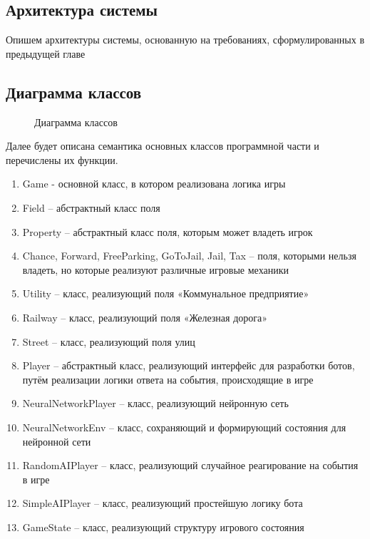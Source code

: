 \newpage
\setlength{\parskip}{0cm}
\begin{Large}
\section{Архитектура системы}
Опишем архитектуры системы, основанную на требованиях, сформулированных в предыдущей главе
\subsection{Диаграмма классов}
\begin{figure}[h]
    \caption{Диаграмма классов}
\end{figure}
Далее будет описана семантика основных классов программной части и перечислены их функции.
\begin{spacing}{0.9}
\begin{enumerate}
    \item Game - основной класс, в котором реализована логика игры
    \item Field – абстрактный класс поля
    \item Property – абстрактный класс поля, которым может владеть игрок
    \item Chance, Forward, FreeParking, GoToJail, Jail, Tax – поля, которыми нельзя владеть, но которые реализуют различные игровые механики
    \item Utility – класс, реализующий поля «Коммунальное предприятие»
    \item Railway – класс, реализующий поля «Железная дорога»
    \item Street – класс, реализующий поля улиц
    \item Player – абстрактный класс, реализующий интерфейс для разработки ботов, путём реализации логики ответа на события, происходящие в игре
    \item NeuralNetworkPlayer – класс, реализующий нейронную сеть
    \item NeuralNetworkEnv – класс, сохраняющий и формирующий состояния для нейронной сети
    \item RandomAIPlayer – класс, реализующий случайное реагирование на события в игре
    \item SimpleAIPlayer – класс, реализующий простейшую логику бота
    \item GameState – класс, реализующий структуру игрового состояния
\end{enumerate}
\end{spacing}

\end{Large}
